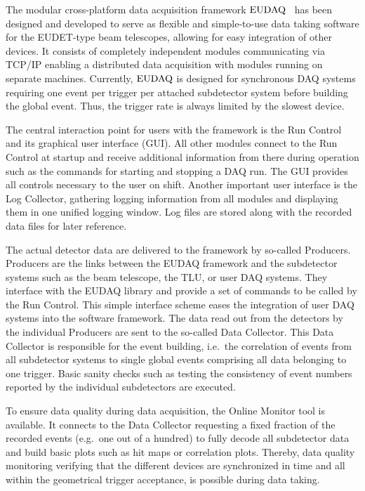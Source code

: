 
The modular cross-platform data acquisition framework $\textrm{EUDAQ}$~\cite{ref:eudaqwebsite} has been designed and developed to serve as flexible and simple-to-use data taking software for the EUDET-type beam telescopes,
 allowing for easy integration of other devices. 
It consists of completely independent modules communicating via TCP/IP enabling a distributed data acquisition with modules running on separate machines. 
Currently, $\textrm{EUDAQ}$ is designed for synchronous DAQ systems requiring one event per trigger per attached subdetector system before building the global event. 
Thus, the trigger rate is always limited by the slowest device.

The central interaction point for users with the framework is the Run Control and its graphical user interface (GUI). 
All other modules connect to the Run Control at startup and receive additional information from there during operation such as the commands for starting and stopping a DAQ run. 
The GUI provides all controls necessary to the user on shift. 
Another important user interface is the Log Collector, gathering logging information from all modules and displaying them in one unified logging window. 
Log files are stored along with the recorded data files for later reference.

The actual detector data are delivered to the framework by so-called Producers.
Producers are the links between the EUDAQ framework and the subdetector systems such as the beam telescope, the TLU, or user DAQ systems.
They interface with the EUDAQ library and provide a set of commands to be called by the Run Control. 
This simple interface scheme eases the integration of user DAQ systems into the software framework.
The data read out from the detectors by the individual Producers are sent to the so-called Data Collector. 
This Data Collector is responsible for the event building, i.e.\ the correlation of events from all subdetector systems to single global events comprising all data belonging to one trigger. 
Basic sanity checks such as testing the consistency of event numbers reported by the individual subdetectors are executed.

To ensure data quality during data acquisition, the Online Monitor tool is available. 
It connects to the Data Collector requesting a fixed fraction of the recorded events (e.g.\ one out of a hundred) to fully decode all subdetector data
 and build basic plots such as hit maps or correlation plots.
Thereby, data quality monitoring verifying that the different devices are synchronized in time and all within the geometrical trigger acceptance, is possible during data taking.

